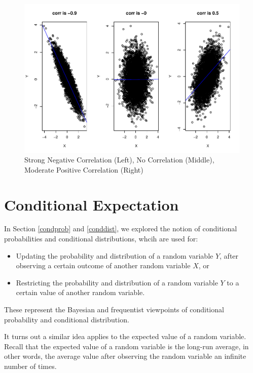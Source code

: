 \documentclass[
]{book}
\providecommand{\tightlist}{%
  \setlength{\itemsep}{0pt}\setlength{\parskip}{0pt}}
\begin{document}
\begin{figure}
\centering
\includegraphics{bookdown-demo_files/figure-latex/5-corrs-1.pdf}
\caption{\label{fig:5-corrs}Strong Negative Correlation (Left), No Correlation (Middle), Moderate Positive Correlation (Right)}
\end{figure}

\section{Conditional Expectation}\label{conditional-expectation}

In Section \ref{condprob} and \ref{conddist}, we explored the notion of conditional probabilities and conditional distributions, whcih are used for:

\begin{itemize}
\tightlist
\item
  Updating the probability and distribution of a random variable \(Y\), after observing a certain outcome of another random variable \(X\), or
\item
  Restricting the probability and distribution of a random variable \(Y\) to a certain value of another random variable.
\end{itemize}

These represent the Bayesian and frequentist viewpoints of conditional probability and conditional distribution.

It turns out a similar idea applies to the expected value of a random variable. Recall that the expected value of a random variable is the long-run average, in other words, the average value after observing the random variable an infinite number of times.
\end{document}
